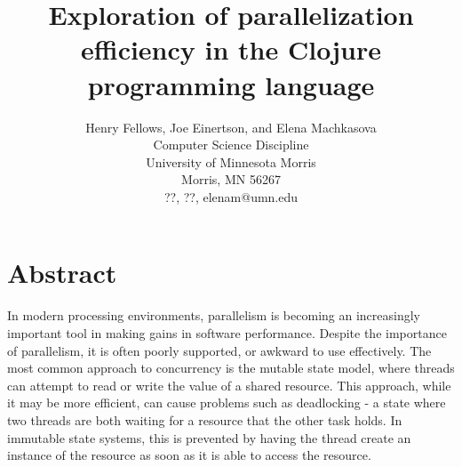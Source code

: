 \documentclass[12pt]{article}
\newcommand{\comment}[1]{{\bf \tt  {#1}}}
\begin{document}
\pagestyle{plain}
%




\title{Exploration of parallelization efficiency in the Clojure programming language}
%
%




\author{
Henry Fellows, Joe Einertson, and Elena Machkasova \\
Computer Science Discipline \\
University of Minnesota Morris\\
Morris, MN 56267\\
??, ??, elenam@umn.edu
}




\date{}




\maketitle
\thispagestyle{empty}


\section*{\centering Abstract}
In modern processing environments, parallelism is becoming an increasingly important tool in making gains in software performance. Despite the importance of parallelism, it is often poorly supported, or awkward to use effectively. The most common approach to concurrency is the mutable state model, where threads can attempt to read or write the value of a shared resource. This approach, while it may be more efficient, can cause problems such as deadlocking - a state where two threads are both waiting for a resource that the other task holds. In immutable state systems, this is prevented by having the thread create an instance of the resource as soon as it is able to access the resource.
\end{document}
